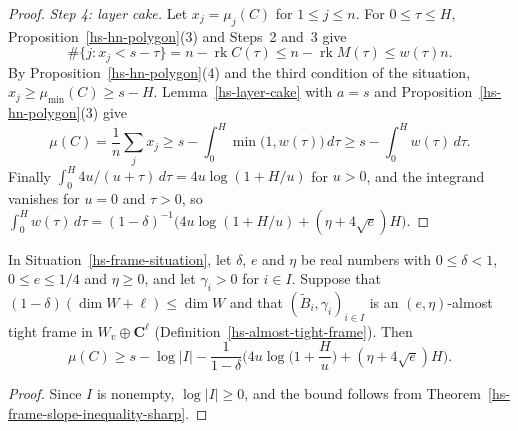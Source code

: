 \begin{proof}
\emph{Step 4: layer cake.} Let $x_j=\mu_j(C)$ for $1\leq j\leq n$. For $0\leq\tau\leq H$,
Proposition~\ref{hs-hn-polygon}(3) and Steps~2 and~3 give
\[
 \#\{j:x_j<s-\tau\}=n-\operatorname{rk}C(\tau)\leq n-\operatorname{rk}M(\tau)\leq w(\tau)n .
\]
By Proposition~\ref{hs-hn-polygon}(4) and the third condition of the situation,
$x_j\geq\mu_{\min}(C)\geq s-H$. Lemma~\ref{hs-layer-cake} with $a=s$ and
Proposition~\ref{hs-hn-polygon}(3) give
\[
 \mu(C)=\frac1n\sum_jx_j\geq s-\int_0^H\min\big(1,w(\tau)\big)\,d\tau
 \geq s-\int_0^Hw(\tau)\,d\tau .
\]
Finally $\int_0^H4u/(u+\tau)\,d\tau=4u\log(1+H/u)$ for $u>0$, and the integrand vanishes for
$u=0$ and $\tau>0$, so
$\int_0^Hw(\tau)\,d\tau=(1-\delta)^{-1}\big(4u\log(1+H/u)+(\eta+4\sqrt e)H\big)$.
\end{proof}

\begin{corollary}\label{hs-frame-slope-inequality}
In Situation~\ref{hs-frame-situation}, let $\delta$, $e$ and $\eta$ be real numbers with
$0\leq\delta<1$, $0\leq e\leq1/4$ and $\eta\geq0$, and let $\gamma_i>0$ for $i\in I$. Suppose
that $(1-\delta)(\dim W+\ell)\leq\dim W$ and that $(\tilde B_i,\gamma_i)_{i\in I}$ is an
$(e,\eta)$-almost tight frame in $W_v\oplus\mathbf C^\ell$
(Definition~\ref{hs-almost-tight-frame}). Then
\[
 \mu(C)\geq s-\log|I|-\frac1{1-\delta}\Big(4u\log\Big(1+\frac Hu\Big)+(\eta+4\sqrt e)H\Big).
\]
\end{corollary}

\begin{proof}
Since $I$ is nonempty, $\log|I|\geq0$, and the bound follows from
Theorem~\ref{hs-frame-slope-inequality-sharp}.
\end{proof}

